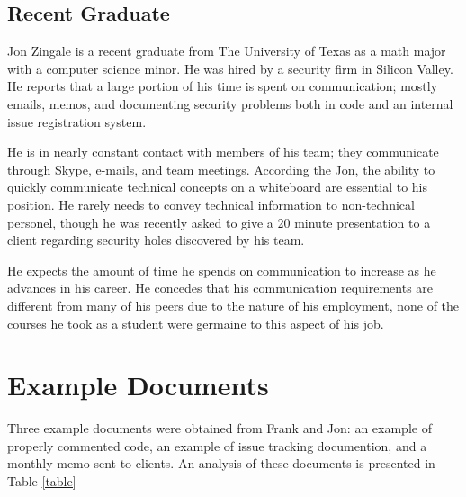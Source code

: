 \documentclass[prodmode,acmtecs]{acmsmall} %
\begin{document}
\subsection{Recent Graduate}
Jon Zingale is a recent graduate from The University of Texas as a math major with a computer science minor.  He was hired by a security firm in Silicon Valley.  He reports that a large portion of his time is spent on communication; mostly emails, memos, and documenting security problems both in code and an internal issue registration system.

He is in nearly constant contact with members of his team; they communicate through Skype, e-mails, and team meetings.  According the Jon, the ability to quickly communicate technical concepts on a whiteboard are essential to his position.  He rarely needs to convey technical information to non-technical personel, though he was recently asked to give a 20 minute presentation to a client regarding security holes discovered by his team.  

He expects the amount of time he spends on communication to increase as he advances in his career.  He concedes that his communication requirements are different from many of his peers due to the nature of his employment, none of the courses he took as a student were germaine to this aspect of his job.

\section{Example Documents}\label{ex_documents}
Three example documents were obtained from Frank and Jon: an example of properly commented code, an example of issue tracking documention, and a monthly memo sent to clients.  An analysis of these documents is presented in Table \ref{table}\\

\FloatBarrier
\end{document}
